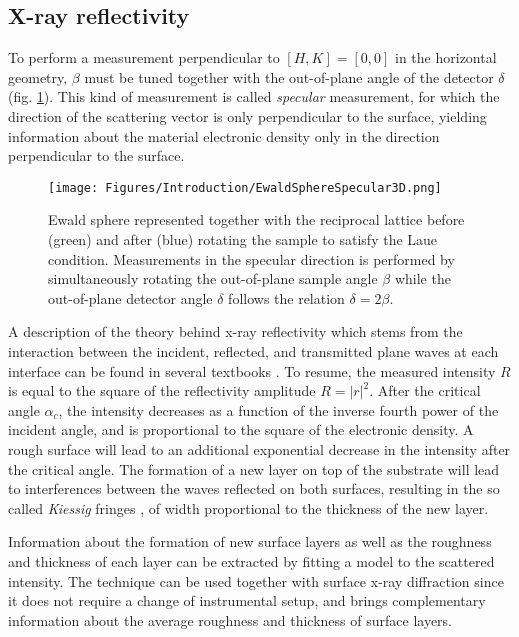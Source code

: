 \subsection{X-ray reflectivity}\label{sec:XRR}

To perform a measurement perpendicular to $[H, K] = [0, 0]$ in the horizontal geometry, $\beta$ must be tuned together with the out-of-plane angle of the detector $\delta$ (fig. \ref{fig:EwaldSphereSpecular}).
This kind of measurement is called \textit{specular} measurement, for which the direction of the scattering vector is only perpendicular to the surface, yielding information about the material electronic density only in the direction perpendicular to the surface.

\begin{figure}[!htb]
    \centering
    \texttt{[image: Figures/Introduction/EwaldSphereSpecular3D.png]}
    \caption{
    Ewald sphere represented together with the reciprocal lattice before (green) and after (blue) rotating the sample to satisfy the Laue condition.
    Measurements in the specular direction is performed by simultaneously rotating the out-of-plane sample angle $\beta$ while the out-of-plane detector angle $\delta$ follows the relation $\delta=2\beta$.
    }
    \label{fig:EwaldSphereSpecular}
\end{figure}

A description of the theory behind x-ray reflectivity which stems from the interaction between the incident, reflected, and transmitted plane waves at each interface can be found in several textbooks \parencite{Willmott}.
To resume, the measured intensity $R$ is equal to the square of the reflectivity amplitude $R=|r|^2$.
After the critical angle $\alpha_c$, the intensity decreases as a function of the inverse fourth power of the incident angle, and is proportional to the square of the electronic density.
A rough surface will lead to an additional exponential decrease in the intensity after the critical angle.
The formation of a new layer on top of the substrate will lead to interferences between the waves reflected on both surfaces, resulting in the so called \textit{Kiessig} fringes \parencite{Kiessig1931}, of width proportional to the thickness of the new layer.

Information about the formation of new surface layers as well as the roughness and thickness of each layer can be extracted by fitting a model to the scattered intensity.
The technique can be used together with surface x-ray diffraction since it does not require a change of instrumental setup, and brings complementary information about the average roughness and thickness of surface layers.